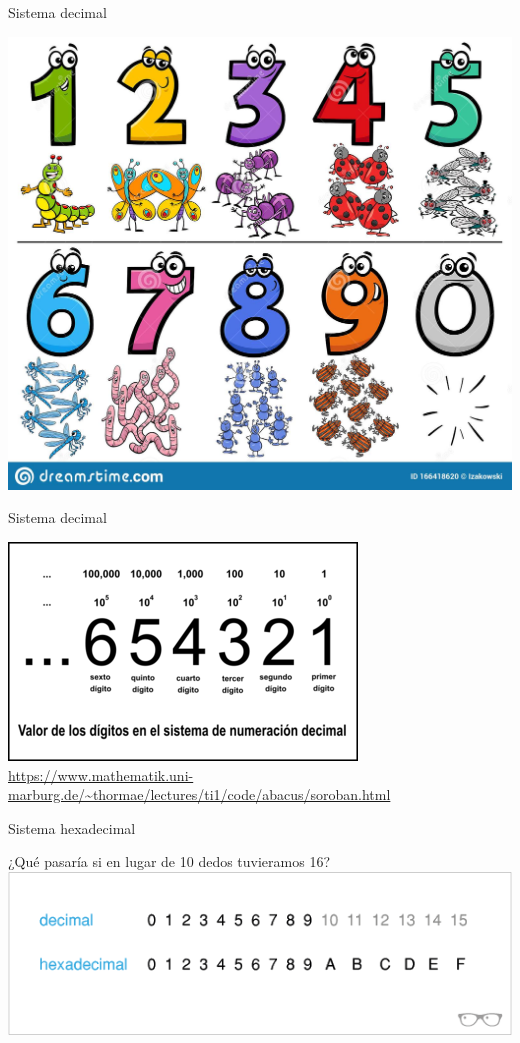 \documentclass[10pt,xcolor={dvipsnames}]{beamer}
\begin{document}
\begin{frame}{Sistema decimal}
\begin{center}
\includegraphics[scale=0.6]{Figures/2numeros}
\end{center}
\end{frame}

\begin{frame}{Sistema decimal}
\begin{center}
\includegraphics[scale=0.8]{Figures/2decimal} \\ \pause
\url{https://www.mathematik.uni-marburg.de/~thormae/lectures/ti1/code/abacus/soroban.html}
\end{center}
\end{frame}

\begin{frame}{Sistema hexadecimal}
\begin{center}
\Large{¿Qué pasaría si en lugar de 10 dedos tuvieramos 16?} \\ \pause
\includegraphics[scale=0.55]{Figures/2hexadecimales}
\end{center}
\end{frame}
\end{document}
